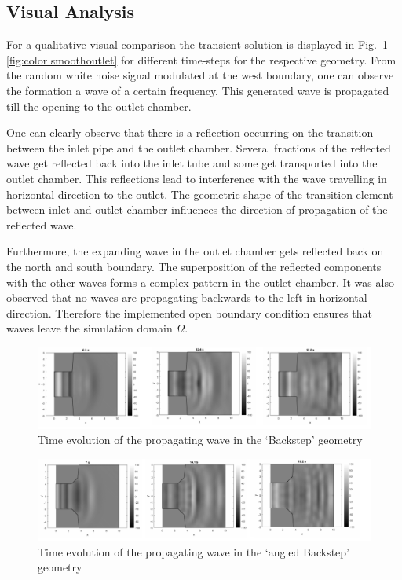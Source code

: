 \documentclass[fleqn,12pt]{NTFD} %
\begin{document}
\subsection{Visual Analysis}
For a qualitative visual comparison the transient solution is displayed in Fig.~\ref{fig:color backstep}-\ref{fig:color smoothoutlet} for different time-steps for the respective geometry. From the random white noise signal modulated at the west boundary, one can observe the formation a wave of a certain frequency. This generated wave is propagated till the opening to the outlet chamber. 

 One can clearly observe that there is a reflection occurring on the transition between the inlet pipe and the outlet chamber. Several fractions of the reflected wave get reflected back into the inlet tube and some get transported into the outlet chamber. This reflections lead to interference with the wave travelling in horizontal direction to the outlet. The geometric shape of the transition element between inlet and outlet chamber influences the direction of propagation of the reflected wave.
 
 Furthermore, the expanding wave in the outlet chamber gets reflected back on the north and south boundary. The superposition of the reflected components with the other waves forms a complex pattern in the outlet chamber. It was also observed that no waves are propagating backwards to the left in horizontal direction. Therefore the implemented open boundary condition ensures that waves leave the simulation domain $\Omega$.

\begin{figure}[ht]\centering %
\includegraphics[width=\linewidth]{color_backstep.png}
\caption{Time evolution of the propagating wave in the `Backstep' geometry}
\label{fig:color backstep}
\end{figure}

\begin{figure}[ht]\centering %
\includegraphics[width=\linewidth]{color_angledbackstep.png}
\caption{Time evolution of the propagating wave in the `angled Backstep' geometry}
\label{fig:color angledbackstep}
\end{figure}
\end{document}
